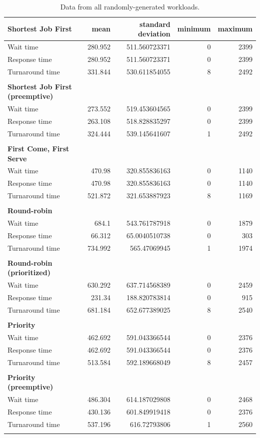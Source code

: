 \documentclass[12pt,letterpaper]{article}
\begin{document}
  		 	\begin{table}
	  			\caption{Data from all randomly-generated workloads.}
		  		\begin{tabular}{l r r r r}
					\textbf{Shortest Job First} & mean & standard deviation & minimum & maximum\\
					\hline
Wait time &		280.952 &	511.560723371 &	0 &	2399 	\\
Response time &		280.952 &	511.560723371 &	0 &	2399 	\\
Turnaround time &	331.844 &	530.611854055 &	8 &	2492 	\\
					\\
					\textbf{Shortest Job First (preemptive)} \\
					\hline
Wait time &		273.552 &	519.453604565 &	0 &	2399 	\\
Response time &		263.108 &	518.828835297 &	0 &	2399 	\\
Turnaround time &	324.444 &	539.145641607 &	1 &	2492 	\\
					\\
					\textbf{First Come, First Serve} \\
					\hline
Wait time &		470.98 &	320.855836163 &	0 &	1140 	\\
Response time &		470.98 &	320.855836163 &	0 &	1140 	\\
Turnaround time &	521.872 &	321.653887923 &	8 &	1169 	\\
					\\
					\textbf{Round-robin} \\
					\hline
Wait time &		684.1 &	543.761787918 &	0 &	1879 	\\
Response time &		66.312 &	65.0040510738 &	0 &	303 	\\
Turnaround time &	734.992 &	565.47069945 &	1 &	1974 	\\
					\\
					\textbf{Round-robin (prioritized)} \\
					\hline
Wait time &		630.292 &	637.714568389 &	0 &	2459 	\\
Response time &		231.34 &	188.820783814 &	0 &	915 	\\
Turnaround time &	681.184 &	652.677389025 &	8 &	2540 	\\
					\\
					\textbf{Priority} \\
					\hline
Wait time &		462.692 &	591.043366544 &	0 &	2376 	\\
Response time &		462.692 &	591.043366544 &	0 &	2376 	\\
Turnaround time &	513.584 &	592.189668049 &	8 &	2457 	\\
					\\
					\textbf{Priority (preemptive)} \\
					\hline
Wait time &		486.304 &	614.187029808 &	0 &	2468 	\\
Response time &		430.136 &	601.849919418 &	0 &	2376 	\\
Turnaround time &	537.196 &	616.72793806 &	1 &	2560 	\\
					\\
				\end{tabular}
				\label{table:data-rands}
			\end{table}
\end{document}
